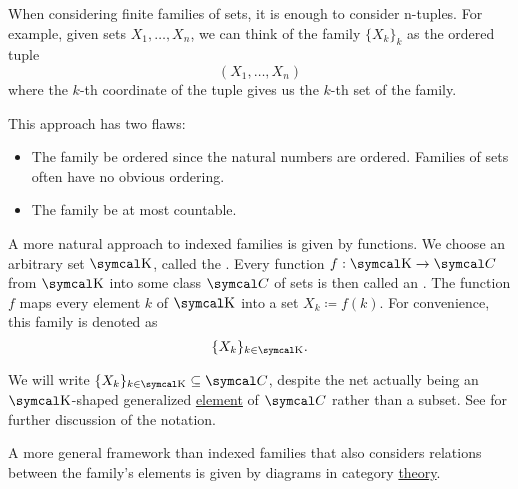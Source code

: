 \begin{definition}\label{def:indexed_family}
  When considering finite families of sets, it is enough to consider n-tuples. For example, given sets \( X_1, \ldots, X_n \), we can think of the family \( \{ X_k \}_k \) as the ordered tuple
  \begin{equation*}
    (X_1, \ldots, X_n)
  \end{equation*}
  where the \( k \)-th coordinate of the tuple gives us the \( k \)-th set of the family.

  This approach has two flaws:
  \begin{itemize}
    \item The family  be ordered since the natural numbers are ordered. Families of sets often have no obvious ordering.
    \item The family  be at most countable.
  \end{itemize}

  A more natural approach to indexed families is given by functions. We choose an arbitrary set \( \CK \), called the . Every function \( f: \CK \to \Cal C \) from \( \CK \) into some class \( \Cal C \) of sets is then called an . The function \( f \) maps every element \( k \) of \( \CK \) into a set \( X_k \coloneqq f(k) \). For convenience, this family is denoted as
  \begin{equation*}
    \{ X_k \}_{k \in \CK}.
  \end{equation*}

  We will write \( \{ X_k \}_{k \in \CK} \subseteq \Cal{C} \), despite the net actually being an \( \CK \)-shaped generalized \hyperref[def:generalized_element]{element} of \( \Cal{C} \) rather than a subset. See  for further discussion of the notation.

  A more general framework than indexed families that also considers relations between the family's elements is given by diagrams in category \hyperref[def:categorical_diagram]{theory}.
\end{definition}


